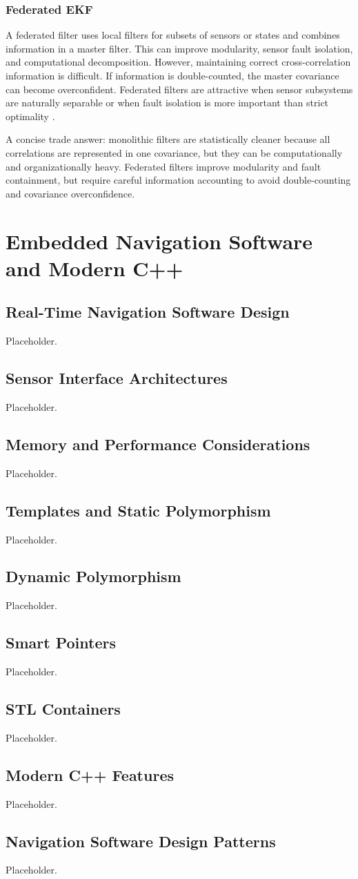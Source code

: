 \documentclass[11pt,oneside]{book}
\begin{document}
\subsection{Federated EKF}
A federated filter uses local filters for subsets of sensors or states and combines information in a master filter. This can improve modularity, sensor fault isolation, and computational decomposition. However, maintaining correct cross-correlation information is difficult. If information is double-counted, the master covariance can become overconfident. Federated filters are attractive when sensor subsystems are naturally separable or when fault isolation is more important than strict optimality \cite{farrell2008,barshalom2001}.

\begin{interviewbox}
A concise trade answer: monolithic filters are statistically cleaner because all correlations are represented in one covariance, but they can be computationally and organizationally heavy. Federated filters improve modularity and fault containment, but require careful information accounting to avoid double-counting and covariance overconfidence.
\end{interviewbox}


\chapter{Embedded Navigation Software and Modern C++}
\section{Real-Time Navigation Software Design}
Placeholder.
\section{Sensor Interface Architectures}
Placeholder.
\section{Memory and Performance Considerations}
Placeholder.
\section{Templates and Static Polymorphism}
Placeholder.
\section{Dynamic Polymorphism}
Placeholder.
\section{Smart Pointers}
Placeholder.
\section{STL Containers}
Placeholder.
\section{Modern C++ Features}
Placeholder.
\section{Navigation Software Design Patterns}
Placeholder.

\backmatter
\printbibliography
\end{document}
